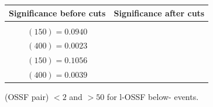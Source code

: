 \documentclass[letterpaper,12pt]{article}
\begin{document}
\begin{figure}[h!]
{  }
  \makebox[\textwidth][c]{%
    \rule{0pt}{0.6cm}
    }
  \tiny
  \setlength{\tabcolsep}{20pt}
  \renewcommand{\arraystretch}{1.6}
  \begin{tabular}{|c|c|}
    \hline
    Significance before cuts & Significance after cuts\\
    \hline
    \Gape[0.2cm]{\makecell{
        \sig{} $(100) = 0.1192$\\
        \sig{} $(150) = 0.0940$\\
        \sig{} $(400) = 0.0023$ }} & 
    \makecell{
      \sig{} $(100) = 0.1446$\\
      \sig{} $(150) = 0.1056$\\
      \sig{} $(400) = 0.0039$}\\
    \hline
  \end{tabular}
  \caption[\3l-OSSF Cut-1: \DeltaR{} (OSSF pair) $<2$ and \ptmiss{} $>50$]{\DeltaR{} (OSSF pair) $<2$ and \ptmiss{} $>50$ for \3l-OSSF below-\Zboson{} events.}
  \label{fig:3lc1}
  \vspace{1cm}
\end{figure}
\end{document}
